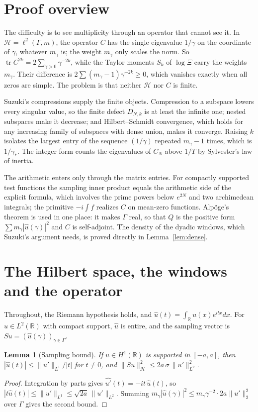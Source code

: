 \documentclass[11pt,a4paper]{article}
\theoremstyle{plain}
\newtheorem{lemma}[theorem]{Lemma}
\theoremstyle{remark}
\DeclareMathOperator{\tr}{tr}
\newcommand{\R}{\mathbb R}
\newcommand{\Hs}{\mathcal H}
\begin{document}
\section{Proof overview}

The difficulty is to see multiplicity through an operator that cannot see it. In $\Hs=\ell^2(\Gamma,m)$, the operator
$C$ has the single eigenvalue $1/\gamma$ on the coordinate of $\gamma$, whatever $m_\gamma$ is; the weight $m_\gamma$
only scales the norm. So $\tr C^{2k}=2\sum_{\gamma>0}\gamma^{-2k}$, while the Taylor moments $S_k$ of $\log\Xi$
carry the weights $m_\gamma$. Their difference is $2\sum(m_\gamma-1)\gamma^{-2k}\ge0$, which vanishes exactly when
all zeros are simple. The problem is that neither $\Hs$ nor $C$ is finite.

Suzuki's compressions supply the finite objects. Compression to a subspace lowers every singular value, so the finite
defect $D_{N,k}$ is at least the infinite one; nested subspaces make it decrease; and Hilbert--Schmidt convergence,
which holds for any increasing family of subspaces with dense union, makes it converge. Raising $k$ isolates the
largest entry of the sequence $(1/\gamma)$ repeated $m_\gamma-1$ times, which is $1/\gamma_*$. The integer form
counts the eigenvalues of $C_N$ above $1/T$ by Sylvester's law of inertia.

The arithmetic enters only through the matrix entries. For compactly supported test functions the sampling inner
product equals the arithmetic side of the explicit formula, which involves the prime powers below $e^{2N}$ and two
archimedean integrals; the primitive $-i\int f$ realizes $C$ on mean-zero functions. Alp\"oge's theorem is used in one
place: it makes $\Gamma$ real, so that $Q$ is the positive form $\sum m_\gamma|\widehat u(\gamma)|^2$ and $C$ is
self-adjoint. The density of the dyadic windows, which Suzuki's argument needs, is proved directly in
Lemma~\ref{lem:dense}.

\section{The Hilbert space, the windows and the operator}\label{sec:space}

Throughout, the Riemann hypothesis holds, and $\widehat u(t)=\int_\R u(x)e^{itx}dx$. For $u\in L^2(\R)$ with compact
support, $\widehat u$ is entire, and the sampling vector is $Su=(\widehat u(\gamma))_{\gamma\in\Gamma}$.

\begin{lemma}[Sampling bound]\label{lem:sample}
If $u\in H^1(\R)$ is supported in $[-a,a]$, then $|\widehat u(t)|\le\|u'\|_{L^1}/|t|$ for $t\ne0$, and
$\|Su\|_\Hs^2\le 2a\,\sigma\,\|u'\|_{L^2}^2$.
\end{lemma}
\begin{proof}
Integration by parts gives $\widehat{u'}(t)=-it\,\widehat u(t)$, so $|t\widehat u(t)|\le\|u'\|_{L^1}\le
\sqrt{2a}\,\|u'\|_{L^2}$. Summing $m_\gamma|\widehat u(\gamma)|^2\le m_\gamma\gamma^{-2}\cdot2a\|u'\|_2^2$ over
$\Gamma$ gives the second bound.
\end{proof}
\end{document}
